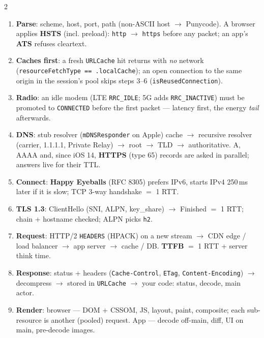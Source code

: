 \documentclass[8pt]{extarticle}
\newcommand\ct[1]{\texttt{#1}}
\newcommand\hd[1]{\par\vspace{3pt}\noindent{\bfseries\color{sheetBlue}#1}\par\vspace{1pt}}
\begin{document}
\begin{multicols}{2}
\raggedright{}

\hd{The nine steps}
\begin{enumerate}
  \item \textbf{Parse}: scheme, host, port, path (non-ASCII host $\to$ Punycode). A browser applies
        \textbf{HSTS} (incl. preload): \ct{http} $\to$ \ct{https} before any packet; an app's \textbf{ATS} refuses cleartext.
  \item \textbf{Caches first}: a fresh \ct{URLCache} hit returns with \emph{no} network
        (\ct{resourceFetchType == .localCache}); an open connection to the same origin in the
        session's pool skips steps 3–6 (\ct{isReusedConnection}).
  \item \textbf{Radio}: an idle modem (LTE \ct{RRC\_IDLE}; 5G adds \ct{RRC\_INACTIVE}) must be
        promoted to \ct{CONNECTED} before the first packet — latency first, the energy
        \emph{tail} afterwards.
  \item \textbf{DNS}: stub resolver (\ct{mDNSResponder} on Apple) cache $\to$ recursive resolver
        (carrier, 1.1.1.1, Private Relay) $\to$ root $\to$ TLD $\to$ authoritative. A, AAAA and, since
        iOS 14, \textbf{HTTPS} (type 65) records are asked in parallel; answers live for their TTL.
  \item \textbf{Connect}: \textbf{Happy Eyeballs} (RFC 8305) prefers IPv6, starts IPv4 250\,ms later if
        it is slow; TCP 3-way handshake $=$ 1 RTT.
  \item \textbf{TLS 1.3}: ClientHello (SNI, ALPN, key\_share) $\to$ Finished $=$ 1 RTT; chain + hostname
        checked; ALPN picks \ct{h2}.
  \item \textbf{Request}: HTTP/2 \ct{HEADERS} (HPACK) on a new stream $\to$ CDN edge / load balancer
        $\to$ app server $\to$ cache / DB. \textbf{TTFB} $=$ 1 RTT + server think time.
  \item \textbf{Response}: status + headers (\ct{Cache-Control}, \ct{ETag}, \ct{Content-Encoding})
        $\to$ decompress $\to$ stored in \ct{URLCache} $\to$ your code: status, decode, main actor.
  \item \textbf{Render}: browser — DOM + CSSOM, JS, layout, paint, composite; each sub-resource is
        another (pooled) request. App — decode off-main, diff, UI on main, pre-decode images.
\end{enumerate}


\end{multicols}
\end{document}

